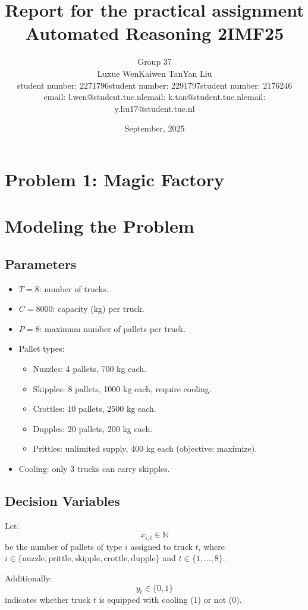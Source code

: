 \documentclass{article}
\title{Report for the practical assignment
Automated Reasoning 2IMF25}
\author{
\begin{tabular}{c c c}
\multicolumn{3}{c}{Group 37}\\[1em]
Luxue Wen & Kaiwen Tan & Yan Liu\\
student number: 2271796 & student number: 2291797 & student number: 2176246\\
email: l.wen@student.tue.nl & email: k.tan@student.tue.nl &  email: y.liu17@student.tue.nl
\end{tabular}
}
\date{September, 2025}
\begin{document}
\maketitle

\section*{Problem 1: Magic Factory}

\section{Modeling the Problem}

\subsection{Parameters}
\begin{itemize}
  \item $T = 8$: number of trucks.
  \item $C = 8000$: capacity (kg) per truck.
  \item $P = 8$: maximum number of pallets per truck.
  \item Pallet types:
    \begin{itemize}
      \item Nuzzles: 4 pallets, 700 kg each.
      \item Skipples: 8 pallets, 1000 kg each, require cooling.
      \item Crottles: 10 pallets, 2500 kg each.
      \item Dupples: 20 pallets, 200 kg each.
      \item Prittles: unlimited supply, 400 kg each (objective: maximize).
    \end{itemize}
  \item Cooling: only 3 trucks can carry skipples.
\end{itemize}

\subsection{Decision Variables}
Let:
\[
x_{i,t} \in \mathbb{N}
\]
be the number of pallets of type $i$ assigned to truck $t$, where $i \in \{\text{nuzzle}, \text{prittle}, \text{skipple}, \text{crottle}, \text{dupple}\}$ and $t \in \{1, \ldots, 8\}$.

Additionally:
\[
y_t \in \{0,1\}
\]
indicates whether truck $t$ is equipped with cooling (1) or not (0).
\end{document}
